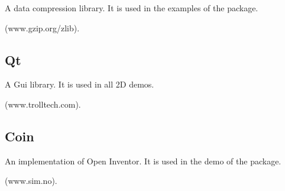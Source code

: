 A data compression library.
It is used in the examples of the  package.

 (www.gzip.org/zlib).

\subsection{Qt \label{thirdparty:Qt}}

A {\sc Gui} library.   It is used in all 2D demos.

 (www.trolltech.com).


\subsection{Coin \label{thirdparty:Coin}}

An implementation of Open Inventor.  It is used in the demo
of the  package.

(www.sim.no).

